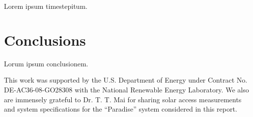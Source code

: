 \documentclass[twocolumn,10pt]{asme2ej}
\begin{document}
Lorem ipsum timestepitum.

\section{Conclusions}

Lorum ipsum conclusionem.


\begin{acknowledgment}
This work was supported by the U.S. Department of Energy under Contract No. DE-AC36-08-GO28308 with the National Renewable Energy Laboratory.  We also are immensely grateful to Dr. T. T. Mai for sharing solar access measurements and system specifications for the ``Paradise'' system considered in this report.
\end{acknowledgment}

%
\end{document}
